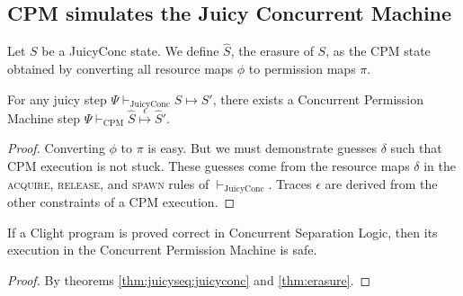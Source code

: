 \subsection{CPM simulates the Juicy Concurrent Machine}\label{sec:erasure}

\begin{definition}
\label{def:erasure}
  Let $S$ be a JuicyConc state.  We define $\hat S$, the erasure of $S$,
  as the CPM state obtained
  by converting all resource maps $\phi$ to permission maps $\pi$.
\end{definition}

\begin{theorem}[Erasure]
\label{thm:erasure}
  For any juicy step $\Psi \vdash_\mathrm{JuicyConc} S \mapsto S'$,
  there exists a Concurrent Permission Machine step
  $\Psi \vdash_\mathrm{CPM} \hat S
  \stackrel{\epsilon}\mapsto \hat S'$.
\end{theorem}
\begin{proof}
  Converting $\phi$ to $\pi$ is easy. But we must
  demonstrate guesses $\delta$ such that
  CPM execution is not stuck.  These guesses come from the
  resource maps $\delta$ in the \textsc{acquire},
  \textsc{release}, and \textsc{spawn} rules of $\vdash_\mathrm{JuicyConc}$.
  Traces $\epsilon$ are derived from the other constraints
  of a CPM execution.
\end{proof}

\begin{corollary}
\label{thm:csl-cpm-safe}
  If a Clight program is proved correct in Concurrent Separation Logic,
  then its execution in the Concurrent Permission Machine is safe.
\end{corollary}
\begin{proof}
By theorems \ref{thm:juicyseq:juicyconc} and
\ref{thm:erasure}.
\end{proof}

